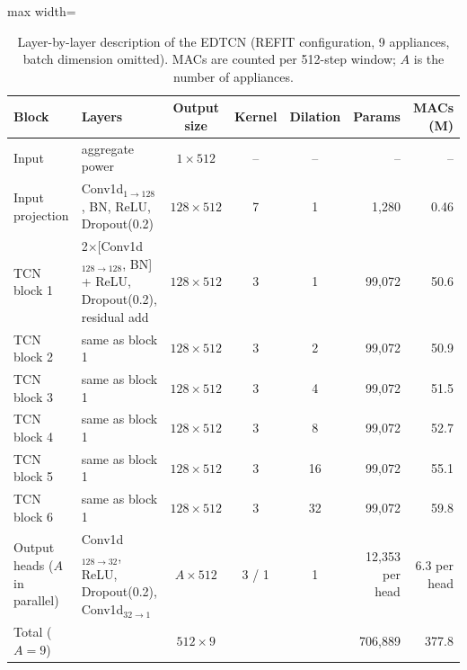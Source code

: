 \begin{table}[H]
\centering
\caption{Layer-by-layer description of the EDTCN (REFIT configuration, 9 appliances, batch dimension omitted). MACs are counted per 512-step window; $A$ is the number of appliances.}
\label{tab:layers}
\footnotesize
\begin{adjustbox}{max width=\textwidth}\begin{tabular}{@{}llcccrr@{}}
\toprule
Block & Layers & Output size & Kernel & Dilation & Params & MACs (M) \\
\midrule
Input & aggregate power & $1\times512$ & -- & -- & -- & -- \\
Input projection & Conv1d$_{1\rightarrow128}$, BN, ReLU, Dropout(0.2) & $128\times512$ & 7 & 1 & 1,280 & 0.46 \\
TCN block 1 & 2$\times$[Conv1d$_{128\rightarrow128}$, BN] + ReLU, Dropout(0.2), residual add & $128\times512$ & 3 & 1 & 99,072 & 50.6 \\
TCN block 2 & same as block 1 & $128\times512$ & 3 & 2 & 99,072 & 50.9 \\
TCN block 3 & same as block 1 & $128\times512$ & 3 & 4 & 99,072 & 51.5 \\
TCN block 4 & same as block 1 & $128\times512$ & 3 & 8 & 99,072 & 52.7 \\
TCN block 5 & same as block 1 & $128\times512$ & 3 & 16 & 99,072 & 55.1 \\
TCN block 6 & same as block 1 & $128\times512$ & 3 & 32 & 99,072 & 59.8 \\
Output heads ($A$ in parallel) & Conv1d$_{128\rightarrow32}$, ReLU, Dropout(0.2), Conv1d$_{32\rightarrow1}$ & $A\times512$ & 3 / 1 & 1 & 12,353 per head & 6.3 per head \\
\midrule
Total ($A=9$) & & $512\times9$ & & & 706,889 & 377.8 \\
\bottomrule
\end{tabular}\end{adjustbox}
\end{table}

